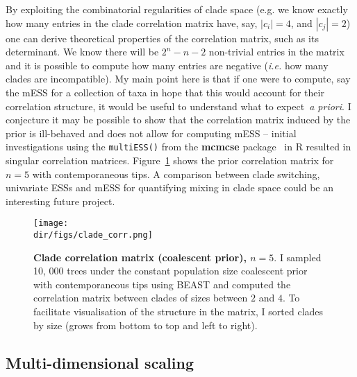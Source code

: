 By exploiting the combinatorial regularities of clade space (e.g. we know exactly how many entries in the clade correlation matrix have, say, $|c_i| = 4$, and $|c_j| = 2$) one can derive theoretical properties of the correlation matrix, such as its determinant.
We know there will be $2^n-n-2$ non-trivial entries in the matrix and it is possible to compute how many entries are negative (\textit{i.e.} how many clades are incompatible). 
My main point here is that if one were to compute, say the mESS for a collection of taxa in hope that this would account for their correlation structure, it would be useful to understand what to expect~\textit{a priori}.
I conjecture it may be possible to show that the correlation matrix induced by the prior is ill-behaved and does not allow for computing mESS -- initial investigations using the \verb|multiESS()| from the \textbf{mcmcse} package~\citep{Flegal2017} in R resulted in singular correlation matrices.
Figure~\ref{fig:clade_corr} shows the prior correlation matrix for $n=5$ with contemporaneous tips.
A comparison between clade switching, univariate ESSs and mESS for quantifying mixing in clade space could be an interesting future project.

\begin{figure}[!ht]
  \begin{center}
  \centering
  \texttt{[image: \\dir/figs/clade\_corr.png]} 
  \end{center}
\caption[Clade correlation matrix (coalescent prior), $n = 5$.]{\textbf{Clade correlation matrix (coalescent prior), $n = 5$}.
I sampled 10, 000 trees under the constant population size coalescent prior with contemporaneous tips using BEAST and computed the correlation matrix between clades of sizes between $2$ and $4$.
To facilitate visualisation of the structure in the matrix, I sorted clades by size (grows from bottom to top and left to right).
}
\label{fig:clade_corr}
\end{figure}


\subsection{Multi-dimensional scaling}
\label{sec:mds}

